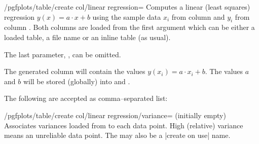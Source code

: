 \begin{stylekey}{/pgfplots/table/create col/linear regression=}
	Computes a linear (least squares) regression $y(x) = a \cdot x + b$ using the sample data $x_i$ from column  and $y_i$ from column . Both columns are loaded from the first argument which can be either a loaded table, a file name or an inline table (as usual).

	The last parameter, , can be omitted.

	The generated column will contain the values $y(x_i) = a \cdot x_i + b$. The values $a$ and $b$ will be stored (globally) into \declareandlabel{\pgfplotstableregressiona} and \declareandlabel{\pgfplotstableregressionb}.

\begin{codeexample}[]
\loadedtbl

	{\loadedtbl}

\pgfplotstabletypeset\loadedtbl

\end{codeexample}

	The following  are accepted as comma--separated list:

	\begin{key}{/pgfplots/table/create col/linear regression/variance= (initially empty)}
	Associates variances loaded from  to each data point. High (relative) variance means an unreliable data point. The  may also be a |create on use| name.
	\end{key}


\end{stylekey}
